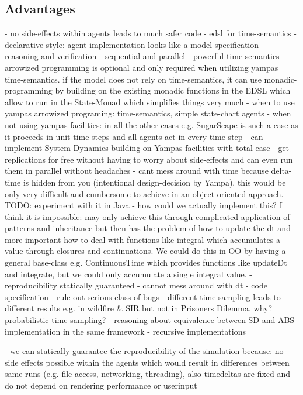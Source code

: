 \subsection{Advantages}
	- no side-effects within agents leads to much safer code
	- edsl for time-semantics
	- declarative style: agent-implementation looks like a model-specification
	- reasoning and verification
	- sequential and parallel
	- powerful time-semantics
	- arrowized programming is optional and only required when utilizing yampas time-semantics. if the model does not rely on time-semantics, it can use monadic-programming by building on the existing monadic functions in the EDSL which allow to run in the State-Monad which simplifies things very much
	- when to use yampas arrowized programing: time-semantics, simple state-chart agents 
	- when not using yampas facilities: in all the other cases e.g. SugarScape is such a case as it proceeds in unit time-steps and all agents act in every time-step
	- can implement System Dynamics building on Yampas facilities with total ease	
	- get replications for free without having to worry about side-effects and can even run them in parallel without headaches
	- cant mess around with time because delta-time is hidden from you (intentional design-decision by Yampa). this would be only very difficult and cumbersome to achieve in an object-oriented approach. TODO: experiment with it in Java - how could we actually implement this? I think it is impossible: may only achieve this through complicated application of patterns and inheritance but then has the problem of how to update the dt and more important how to deal with functions like integral which accumulates a value through closures and continuations. We could do this in OO by having a general base-class e.g. ContinuousTime which provides functions like updateDt and integrate, but we could only accumulate a single integral value.
	- reproducibility statically guaranteed
	- cannot mess around with dt
	- code == specification
	- rule out serious class of bugs
	- different time-sampling leads to different results e.g. in wildfire \& SIR but not in Prisoners Dilemma. why? probabilistic time-sampling?
	- reasoning about equivalence between SD and ABS implementation in the same framework
	- recursive implementations
	
	- we can statically guarantee the reproducibility of the simulation because: no side effects possible within the agents which would result in differences between same runs (e.g. file access, networking, threading), also timedeltas are fixed and do not depend on rendering performance or userinput	
	

